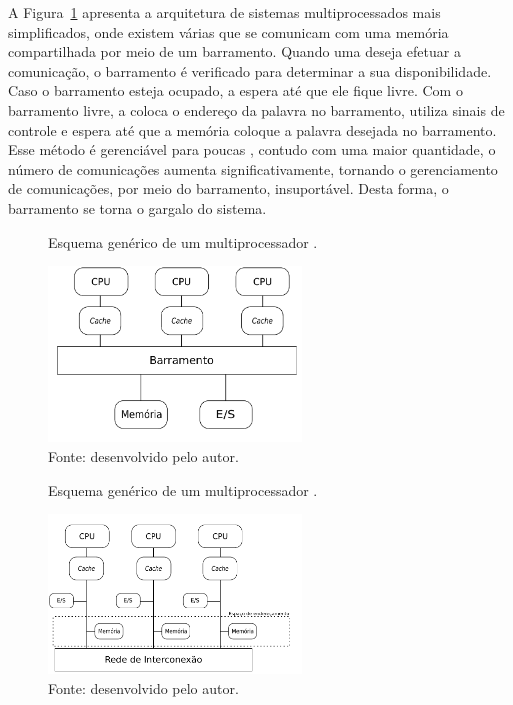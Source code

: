A Figura~\ref{fig:uma} apresenta a arquitetura de sistemas multiprocessados \uma
mais simplificados, onde existem várias \cpus que se
comunicam com uma memória compartilhada por meio de um barramento. Quando uma
\cpu deseja efetuar a comunicação, o barramento é verificado para
determinar a sua disponibilidade. Caso o barramento esteja ocupado, a
\cpu espera até que ele fique livre. Com o barramento livre, a \cpu
coloca o endereço da palavra no barramento, utiliza sinais de
controle e espera até que a memória coloque a palavra desejada no barramento. Esse
método é gerenciável para poucas \cpus, contudo com uma maior quantidade, o
número de comunicações aumenta significativamente, tornando
o gerenciamento de comunicações, por meio do barramento, insuportável. Desta
forma, o barramento se torna o gargalo do sistema.

\begin{figure}[b]
	\centering
    \caption{Esquema genérico de um multiprocessador \uma.}
    \includegraphics[width=0.6\textwidth]{figs/multiproc.pdf}
    \caption*{Fonte: desenvolvido pelo autor.}
    \label{fig:uma}
\end{figure}

\begin{figure}[b]
	\centering
    \caption{Esquema genérico de um multiprocessador \numa.}
    \includegraphics[width=0.6\textwidth]{figs/multiprocNUMA.pdf}
    \caption*{Fonte: desenvolvido pelo autor.}
    \label{fig:numa}
\end{figure}


